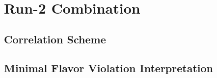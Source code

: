 \chapter{Run-2 Combination}

\section{Correlation Scheme}

\section{Minimal Flavor Violation Interpretation}